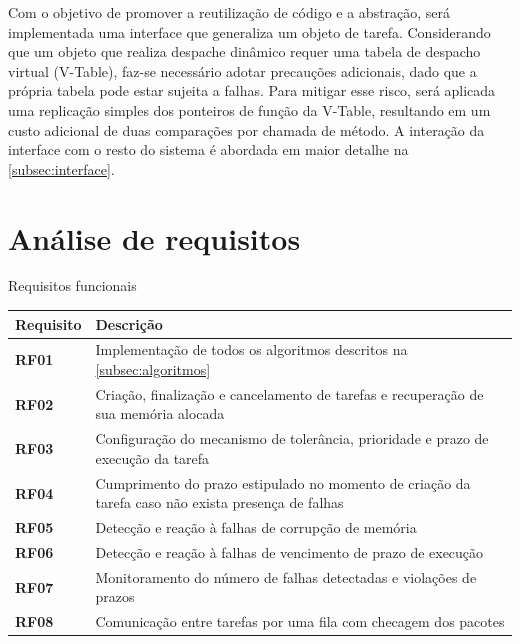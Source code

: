 Com o objetivo de promover a reutilização de código e a abstração, será implementada uma interface que generaliza um objeto de tarefa. Considerando que um objeto que realiza despache dinâmico requer uma tabela de despacho virtual (V-Table), faz-se necessário adotar precauções adicionais, dado que a própria tabela pode estar sujeita a falhas. Para mitigar esse risco, será aplicada uma replicação simples dos ponteiros de função da V-Table, resultando em um custo adicional de duas comparações por chamada de método. A interação da interface com o resto do sistema é abordada em maior detalhe na \autoref{subsec:interface}.

\section{Análise de requisitos}
\label{sec:req}

\begin{quadro}[H]
    \centering
    \caption{Requisitos funcionais}
    \begin{tabular}{|p{}|p{}|}
        \hline
        \rowcolor[HTML]{C0C0C0}
        \textbf{Requisito} & \textbf{Descrição}  \\
        \hline
        
        \textbf{RF01} & Implementação de todos os algoritmos descritos na \autoref{subsec:algoritmos} \\ 
        \hline

        \textbf{RF02} & Criação, finalização e cancelamento de tarefas e recuperação de sua memória alocada \\
        \hline
        
        \textbf{RF03} & Configuração do mecanismo de tolerância, prioridade e prazo de execução da tarefa \\
        \hline

        \textbf{RF04} & Cumprimento do prazo estipulado no momento de criação da tarefa caso não exista presença de falhas \\
        \hline

        \textbf{RF05} & Detecção e reação à falhas de corrupção de memória \\
        \hline

        \textbf{RF06} & Detecção e reação à falhas de vencimento de prazo de execução \\
        \hline
        
        \textbf{RF07} & Monitoramento do número de falhas detectadas e violações de prazos  \\
        \hline
        
        \textbf{RF08} & Comunicação entre tarefas por uma fila com checagem dos pacotes \\
        \hline
    \end{tabular}
    \label{tab:rf}
\end{quadro}

